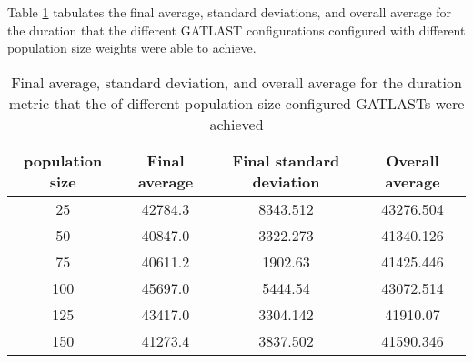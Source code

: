 Table \ref{tab:HP:GA:populationSize:duration} tabulates the final average, standard deviations, and overall average for the duration that the different GATLAST configurations configured with different population size weights were able to achieve.
\begin{table}[tbh!]
\centering
\begin{adjustbox}{trim=0cm 0cm 0cm 0cm, clip=true}
\begin{tabular}{|c|c|c|c|}
\hline
population size & Final average & Final standard deviation & Overall average\\
\hline
25 & 42784.3 & 8343.512 & 43276.504\\\hline
50 & 40847.0 & 3322.273 & 41340.126\\\hline
75 & 40611.2 & 1902.63 & 41425.446\\\hline
100 & 45697.0 & 5444.54 & 43072.514\\\hline
125 & 43417.0 & 3304.142 & 41910.07\\\hline
150 & 41273.4 & 3837.502 & 41590.346\\\hline
\end{tabular}
\end{adjustbox}
\caption{Final average, standard deviation, and overall average for the duration metric that the of different population size configured GATLASTs were achieved}
\label{tab:HP:GA:populationSize:duration}
\end{table}